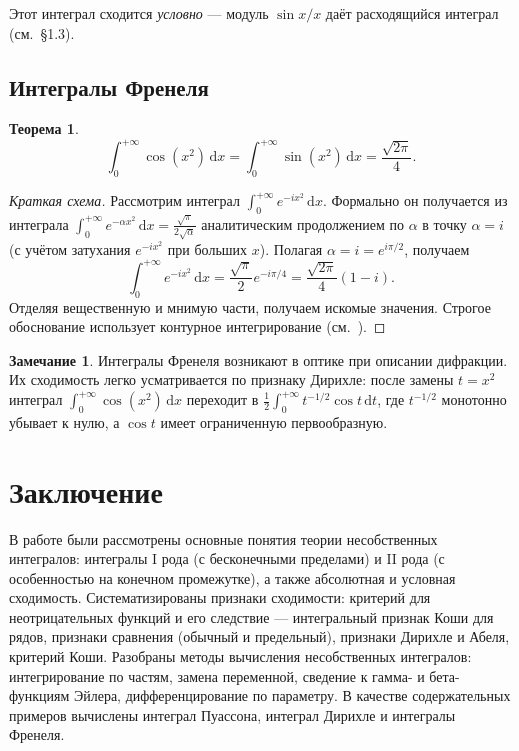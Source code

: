 \documentclass[12pt,a4paper]{article}
\newtheorem{theorem}{Теорема}[section]
\theoremstyle{definition}
\newtheorem{remark}{Замечание}[section]
\newcommand{\dd}{\,\mathrm{d}}
\begin{document}
Этот интеграл сходится \emph{условно} — модуль $\sin x/x$ даёт расходящийся интеграл (см.~\S1.3).

\subsection{Интегралы Френеля}

\begin{theorem}
\[
\int_0^{+\infty}\cos(x^2)\dd x=\int_0^{+\infty}\sin(x^2)\dd x=\frac{\sqrt{2\pi}}{4}.
\]
\end{theorem}

\begin{proof}[Краткая схема]
Рассмотрим интеграл $\int_0^{+\infty}e^{-i x^2}\dd x$. Формально он получается из интеграла $\int_0^{+\infty}e^{-\alpha x^2}\dd x=\frac{\sqrt{\pi}}{2\sqrt{\alpha}}$ аналитическим продолжением по $\alpha$ в точку $\alpha=i$ (с учётом затухания $e^{-i x^2}$ при больших $x$). Полагая $\alpha=i=e^{i\pi/2}$, получаем
\[
\int_0^{+\infty}e^{-i x^2}\dd x=\frac{\sqrt{\pi}}{2}e^{-i\pi/4}=\frac{\sqrt{2\pi}}{4}(1-i).
\]
Отделяя вещественную и мнимую части, получаем искомые значения. Строгое обоснование использует контурное интегрирование (см.~\cite[гл.~XVII,~\S3]{Zorich2}).
\end{proof}

\begin{remark}
Интегралы Френеля возникают в оптике при описании дифракции. Их сходимость легко усматривается по признаку Дирихле: после замены $t=x^2$ интеграл $\int_0^{+\infty}\cos(x^2)\dd x$ переходит в $\frac12\int_0^{+\infty}t^{-1/2}\cos t\dd t$, где $t^{-1/2}$ монотонно убывает к нулю, а $\cos t$ имеет ограниченную первообразную.
\end{remark}

\section*{Заключение}

В работе были рассмотрены основные понятия теории несобственных интегралов: интегралы I рода (с бесконечными пределами) и II рода (с особенностью на конечном промежутке), а также абсолютная и условная сходимость. Систематизированы признаки сходимости: критерий для неотрицательных функций и его следствие — интегральный признак Коши для рядов, признаки сравнения (обычный и предельный), признаки Дирихле и Абеля, критерий Коши. Разобраны методы вычисления несобственных интегралов: интегрирование по частям, замена переменной, сведение к гамма- и бета-функциям Эйлера, дифференцирование по параметру. В качестве содержательных примеров вычислены интеграл Пуассона, интеграл Дирихле и интегралы Френеля.
\end{document}
